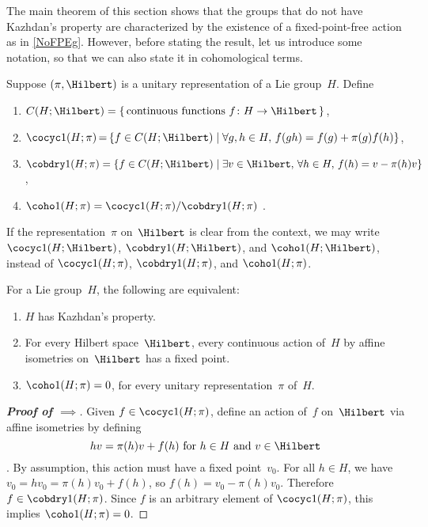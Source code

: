 The main theorem of this section shows that  the groups that do not have Kazhdan's property are characterized by the existence of a fixed-point-free action as in \cref{NoFPEg}. However, before stating the result, let us introduce some notation, so that we can also state it in cohomological terms. 

 \begin{defn} \label{HilbertCohoDefn}
 Suppose $(\pi, \Hilbert)$ is a unitary representation of a Lie group~$H$. Define
 \begin{enumerate}
 \item $C(H;\Hilbert) = \{\, \text{continuous functions $f \colon H \to \Hilbert$} \,\}$,
 
 \item $\cocyc1(H; \pi) \,{=}\, 
 \{ f \in C(H;\Hilbert) \mid  \forall g,h \in H, \, f(gh) = f(g) + \pi(g)  f(h) \}$,

 \item $\cobdry1(H; \pi) = 
 \{ f \in C(H;\Hilbert) \mid  \exists v \in \Hilbert, \, \forall h \in H, \, f(h) = v - \pi(h) v  \}$,
 
 \item $\coho1(H; \pi) = \cocyc1(H; \pi) / \cobdry1(H; \pi)$
.
 \end{enumerate}
If the representation~$\pi$ on~$\Hilbert$ is clear from the context, we may write $\cocyc1(H; \Hilbert)$, $\cobdry1(H; \Hilbert)$, and $\coho1(H; \Hilbert)$,
instead of $\cocyc1(H; \pi)$, $\cobdry1(H; \pi)$, and $\coho1(H; \pi)$.
 \end{defn}

\begin{thm} \label{T<>FH}
 For a Lie group~$H$, the following are equivalent:
 \noprelistbreak
 \begin{enumerate}
 \item  \label{T<>FH-T}
 $H$ has Kazhdan's property.
 \item \label{T<>FH-FP}
  For every Hilbert space~$\Hilbert$, every continuous action of~$H$ by affine isometries
on~$\Hilbert$  has a fixed point.
\item   \label{T<>FH-H1=0}
$\coho1(H; \pi) = 0$, for every unitary representation~$\pi$ of~$H$.
 \end{enumerate}
 \end{thm}

\begin{proof}[\bf {} Proof of $\implies$]
Given $f \in \cocyc1(H;\pi)$, define an action of~$f$ on~$\Hilbert$ via affine isometries by defining 
	$$ \text{$hv = \pi(h) v + f(h)$ for $h \in H$ and $v \in \Hilbert$} $$
. By assumption, this action must have a fixed point~$v_0$. For all $h \in H$, we have
	$ v_0 = h v_0 = \pi(h) v_0 + f(h) $, 
	so $ f(h) = v_0 - \pi(h) v_0$.
Therefore $f \in \cobdry1(H;\pi)$. Since $f$ is an arbitrary element of $\cocyc1(H;\pi)$, this implies $\coho1(H; \pi) = 0$.
\end{proof}

